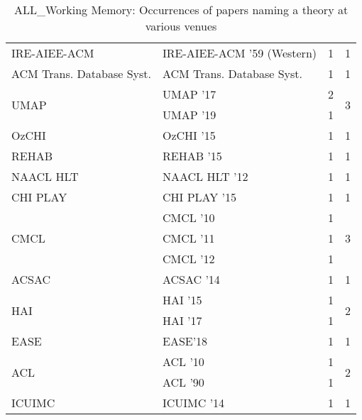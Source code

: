 \begin{table*}[t]
\begin{tabular}{llrr}
\multirow{1}{*}{IRE-AIEE-ACM } & IRE-AIEE-ACM '59 (Western) & 1 & \multirow{1}{*}{1}\\
\multirow{1}{*}{ACM Trans. Database Syst.} & ACM Trans. Database Syst. & 1 & \multirow{1}{*}{1}\\
\multirow{2}{*}{UMAP } & UMAP '17 & 2 & \multirow{2}{*}{3}\\
& UMAP '19 & 1 &\\
\multirow{1}{*}{OzCHI } & OzCHI '15 & 1 & \multirow{1}{*}{1}\\
\multirow{1}{*}{REHAB } & REHAB '15 & 1 & \multirow{1}{*}{1}\\
\multirow{1}{*}{NAACL HLT } & NAACL HLT '12 & 1 & \multirow{1}{*}{1}\\
\multirow{1}{*}{CHI PLAY } & CHI PLAY '15 & 1 & \multirow{1}{*}{1}\\
\multirow{3}{*}{CMCL } & CMCL '10 & 1 & \multirow{3}{*}{3}\\
& CMCL '11 & 1 &\\
& CMCL '12 & 1 &\\
\multirow{1}{*}{ACSAC } & ACSAC '14 & 1 & \multirow{1}{*}{1}\\
\multirow{2}{*}{HAI } & HAI '15 & 1 & \multirow{2}{*}{2}\\
& HAI '17 & 1 &\\
\multirow{1}{*}{EASE} & EASE'18 & 1 & \multirow{1}{*}{1}\\
\multirow{2}{*}{ACL } & ACL '10 & 1 & \multirow{2}{*}{2}\\
& ACL '90 & 1 &\\
\multirow{1}{*}{ICUIMC } & ICUIMC '14 & 1 & \multirow{1}{*}{1}\\
\end{tabular}
\caption{ALL\_Working Memory: Occurrences of papers naming a theory at various venues}
\end{table*}